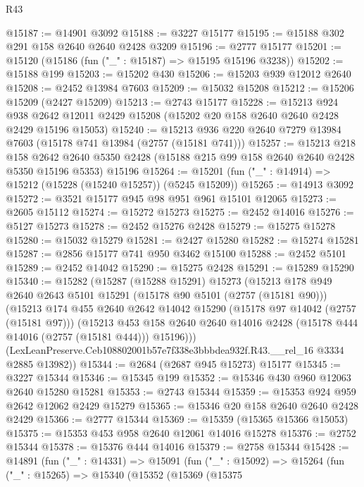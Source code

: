 \begin{lexlean}{R43}
\begin{coremodule}
@15187 := @14901 @3092
@15188 := @3227 @15177
@15195 := @15188 @302 @291 @158 @2640 @2640 @2428 @3209
@15196 := @2777 @15177
@15201 := @15120 (@15186 (fun ("_" : @15187) => @15195 @15196 @3238))
@15202 := @15188 @199
@15203 := @15202 @430
@15206 := @15203 @939 @12012 @2640
@15208 := @2452 @13984 @7603
@15209 := @15032 @15208
@15212 := @15206 @15209 (@2427 @15209)
@15213 := @2743 @15177
@15228 := @15213
    @924
    @938
    @2642
    @12011
    @2429
    @15208
    (@15202 @20 @158 @2640 @2640 @2428 @2429 @15196 @15053)
@15240 := @15213 @936 @220 @2640 @7279 @13984 @7603 (@15178 @741 @13984 (@2757 (@15181 @741)))
@15257 := @15213
    @218
    @158
    @2642
    @2640
    @5350
    @2428
    (@15188 @215 @99 @158 @2640 @2640 @2428 @5350 @15196 @5353)
    @15196
@15264 := @15201 (fun ("_" : @14914) => @15212 (@15228 (@15240 @15257)) (@5245 @15209))
@15265 := @14913 @3092
@15272 := @3521 @15177 @945 @98 @951 @961 @15101 @12065
@15273 := @2605 @15112
@15274 := @15272 @15273
@15275 := @2452 @14016
@15276 := @5127 @15273
@15278 := @2452 @15276 @2428
@15279 := @15275 @15278
@15280 := @15032 @15279
@15281 := @2427 @15280
@15282 := @15274 @15281
@15287 := @2856 @15177 @741 @950 @3462 @15100
@15288 := @2452 @5101
@15289 := @2452 @14042
@15290 := @15275 @2428
@15291 := @15289 @15290
@15340 := @15282
    (@15287
      (@15288 @15291)
      @15273
      (@15213
        @178
        @949
        @2640
        @2643
        @5101
        @15291
        (@15178 @90 @5101 (@2757 (@15181 @90)))
        (@15213
          @174
          @455
          @2640
          @2642
          @14042
          @15290
          (@15178 @97 @14042 (@2757 (@15181 @97)))
          (@15213
            @453
            @158
            @2640
            @2640
            @14016
            @2428
            (@15178 @444 @14016 (@2757 (@15181 @444)))
            @15196)))
      (LexLeanPreserve.Ceb108802001b57e7f338e3bbbdea932f.R43.__rel_16 @3334 @2885 @13982))
@15344 := @2684 (@2687 @945 @15273) @15177
@15345 := @3227 @15344
@15346 := @15345 @199
@15352 := @15346 @430 @960 @12063 @2640 @15280 @15281
@15353 := @2743 @15344
@15359 := @15353 @924 @959 @2642 @12062 @2429 @15279
@15365 := @15346 @20 @158 @2640 @2640 @2428 @2429
@15366 := @2777 @15344
@15369 := @15359 (@15365 @15366 @15053)
@15375 := @15353 @453 @958 @2640 @12061 @14016 @15278
@15376 := @2752 @15344
@15378 := @15376 @444 @14016
@15379 := @2758 @15344
@15428 := @14891
    (fun ("_" : @14331) =>
    @15091
      (fun ("_" : @15092) =>
      @15264
        (fun ("_" : @15265) =>
        @15340
          (@15352
            (@15369
              (@15375

\end{coremodule}
\end{lexlean}
